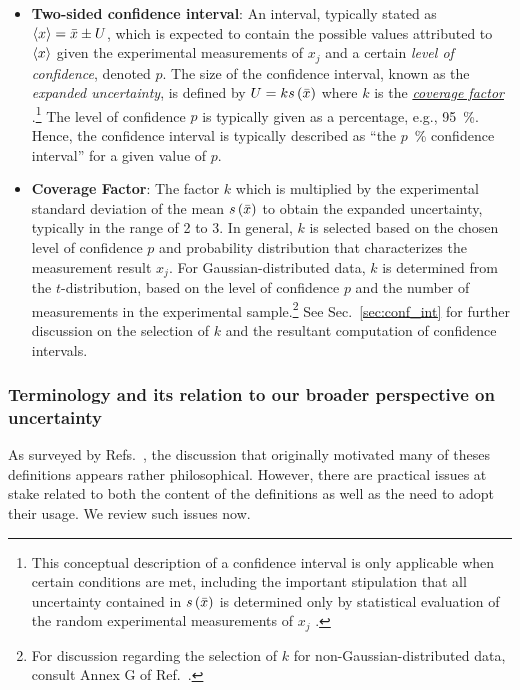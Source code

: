 \begin{itemize}
\item {\bf Two-sided confidence interval}: An interval, typically stated as $\langle x \rangle = \bar{x} \pm U$, which is expected to contain the possible values attributed to $\langle x \rangle$ given the experimental measurements of $x_j$ and a certain {\it level of confidence}, denoted $p$.
  The size of the confidence interval, known as the {\it expanded uncertainty}, is defined by $U = k s\left( \bar{x} \right)$ where $k$ is the \hyperref[def:coveragefactor]{\it coverage factor} \cite{JCGM:VIM2012}.\footnote{This conceptual description of a confidence interval is only applicable when certain conditions are met, including the important stipulation that all uncertainty contained in $s\left( \bar{x} \right)$ is determined only by statistical evaluation of the random experimental measurements of $x_j$ \cite{JCGM:GUM2008}.}
  The level of confidence $p$ is typically given as a percentage, e.g., 95~\%. Hence, the confidence interval is typically described as ``the $p$~\% confidence interval'' for a given value of $p$.
  \label{def:conf_int}

\item {\bf Coverage Factor}:
  The factor $k$ which is multiplied by the experimental standard deviation of the mean \hyperref[def:exp_st_dev_mean]{$s\left( \bar{x} \right)$} to obtain the expanded uncertainty, typically in the range of 2 to 3. In general, $k$ is selected based on the chosen level of confidence $p$ and probability distribution that characterizes the measurement result $x_j$. For Gaussian-distributed data, $k$ is determined from the $t$-distribution, based on the level of confidence $p$ and the number of measurements in the experimental sample.\footnote{For discussion regarding the selection of $k$ for non-Gaussian-distributed data, consult Annex G of Ref.~\cite{JCGM:GUM2008}.} See Sec.~\ref{sec:conf_int} for further discussion on the selection of $k$ and the resultant computation of confidence intervals.
  \label{def:coveragefactor}

\end{itemize}

\subsubsection{Terminology and its relation to our broader perspective on uncertainty}

As surveyed by Refs.~\citep{JCGM:GUM2008,JCGM:VIM2012}, the discussion that originally motivated many of theses definitions appears rather philosophical.  However, there are practical issues at stake related to both the content of the definitions as well as the need to adopt their usage.  We review such issues now.

